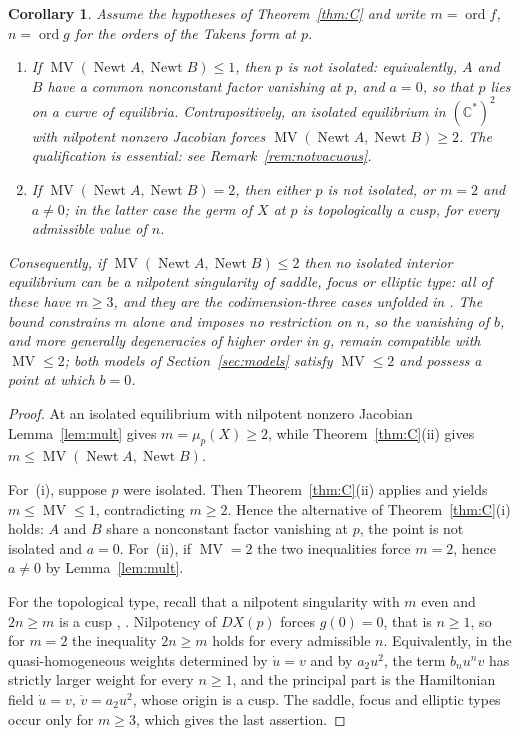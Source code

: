 \documentclass[12pt]{article}
\theoremstyle{plain}
\newtheorem{corollary}[theorem]{Corollary}
\theoremstyle{definition}
\theoremstyle{remark}
\newcommand{\C}{\mathbb{C}}
\DeclareMathOperator{\MV}{MV}
\DeclareMathOperator{\Newt}{Newt}
\begin{document}
	\begin{corollary}\label{cor:cusp}
		Assume the hypotheses of Theorem~\ref{thm:C} and write
		$m=\operatorname{ord}f$, $n=\operatorname{ord}g$ for the orders of the
		Takens form at $p$.
		\begin{enumerate}[label=\rm(\roman*)]
			\item If $\MV(\Newt A,\Newt B)\le1$, then $p$ is not isolated:
			equivalently, $A$ and $B$ have a common nonconstant factor vanishing at
			$p$, and $a=0$, so that $p$ lies on a curve of equilibria.
			Contrapositively, an isolated equilibrium in $(\C^{*})^{2}$ with
			nilpotent nonzero Jacobian forces $\MV(\Newt A,\Newt B)\ge2$.  The
			qualification is essential: see Remark~\ref{rem:notvacuous}.
			\item If $\MV(\Newt A,\Newt B)=2$, then either $p$ is not isolated, or
			$m=2$ and $a\neq0$; in the latter case the germ of $X$ at $p$ is
			topologically a cusp, for every admissible value of $n$.
		\end{enumerate}
		Consequently, if $\MV(\Newt A,\Newt B)\le2$ then no isolated interior
		equilibrium can be a nilpotent singularity of saddle, focus or elliptic
		type: all of these have $m\ge3$, and they are the codimension-three
		cases unfolded in \cite{DRSZ1991}.  The bound constrains $m$ alone and
		imposes no restriction on $n$, so the vanishing of $b$, and more
		generally degeneracies of higher order in $g$, remain compatible with
		$\MV\le2$; both models of Section~\ref{sec:models} satisfy
		$\MV\le2$ and possess a point at which $b=0$.
	\end{corollary}
	
	\begin{proof}
		At an isolated equilibrium with nilpotent nonzero Jacobian
		Lemma~\ref{lem:mult} gives $m=\mu_{p}(X)\ge2$, while
		Theorem~\ref{thm:C}(ii) gives $m\le\MV(\Newt A,\Newt B)$.
		
		For~(i), suppose $p$ were isolated.  Then Theorem~\ref{thm:C}(ii)
		applies and yields $m\le\MV\le1$, contradicting $m\ge2$.  Hence the
		alternative of Theorem~\ref{thm:C}(i) holds: $A$ and $B$ share a
		nonconstant factor vanishing at $p$, the point is not isolated and
		$a=0$.  For~(ii), if $\MV=2$ the two inequalities force $m=2$, hence
		$a\neq0$ by Lemma~\ref{lem:mult}.
		
		For the topological type, recall that a nilpotent singularity with $m$
		even and $2n\ge m$ is a cusp \cite[Ch.~3]{DLA2006}, \cite{Dumortier1977}.
		Nilpotency of $DX(p)$ forces $g(0)=0$, that is $n\ge1$, so for $m=2$
		the inequality $2n\ge m$ holds for every admissible $n$.  Equivalently,
		in the quasi-homogeneous weights determined by $\dot u=v$ and by
		$a_{2}u^{2}$, the term $b_{n}u^{n}v$ has strictly larger weight for
		every $n\ge1$, and the principal part is the Hamiltonian field
		$\dot u=v$, $\dot v=a_{2}u^{2}$, whose origin is a cusp.  The saddle,
		focus and elliptic types occur only for $m\ge3$, which gives the last
		assertion.
	\end{proof}
	
\end{document}
